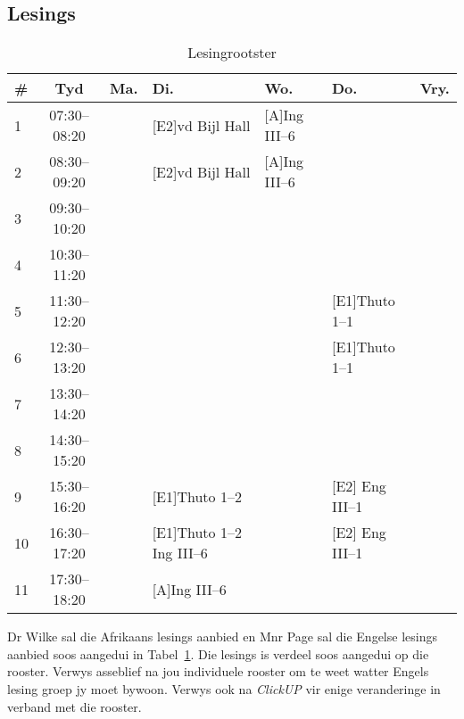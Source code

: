     \subsection{Lesings}
        \begin{table}[!h]
            \begin{center}
             \begin{tabular}{|l|c|p{1.3cm}|p{2.8cm}|p{2.1cm}|p{2.6cm}|p{1.3cm}|}
                 \hline
                 {\bf \#} & {\bf Tyd} & {\bf Ma.} & {\bf Di.} & {\bf Wo.} &
                 {\bf Do.} & {\bf Vry.} \\
                 \hline
                 1  & 07:30--08:20 &  & [E2]vd Bijl Hall & [A]Ing III--6 &  & \\ \hline
                 2  & 08:30--09:20 &  & [E2]vd Bijl Hall & [A]Ing III--6 &  & \\ \hline
                 3  & 09:30--10:20 &  &  &  &  & \\ \hline
                 4  & 10:30--11:20 &  &  &  &  & \\ \hline
                 5  & 11:30--12:20 &  &  &  & [E1]Thuto 1--1 & \\ \hline
                 6  & 12:30--13:20 &  &  &  & [E1]Thuto 1--1 & \\ \hline
                 7  & 13:30--14:20 &  &  &  &  & \\ \hline
                 8  & 14:30--15:20 &  &  &  &  & \\ \hline
                 9  & 15:30--16:20 &  & [E1]Thuto 1--2 &  & [E2] Eng III--1 & \\ \hline
                 10 & 16:30--17:20 &  & [E1]Thuto 1--2 \: [A]Ing III--6 &  & [E2] Eng III--1 & \\ \hline
                 11 & 17:30--18:20 &  & [A]Ing III--6 &  &  & \\
                 \hline
             \end{tabular}
             \caption{Lesingrootster}
            \label{tab:lectures}
            \end{center}
        \end{table}

        Dr Wilke sal die Afrikaans lesings aanbied en Mnr Page sal die Engelse
        lesings aanbied soos aangedui in Tabel~\ref{tab:lectures}. Die lesings
        is verdeel soos aangedui op die rooster. Verwys asseblief na jou
        individuele rooster om te weet watter Engels lesing groep jy moet
        bywoon. Verwys ook na \textit{ClickUP} vir enige veranderinge in
        verband met die rooster.

